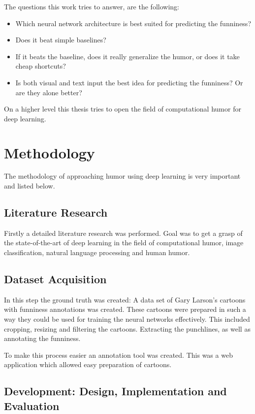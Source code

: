 \documentclass[draft,final,oneside]{vutinfth} %
\begin{document}
The questions this work tries to answer, are the following:

\begin{itemize}
\item Which neural network architecture is best suited for predicting the funniness?
\item Does it beat simple baselines?
\item If it beats the baseline, does it really generalize the humor, or does it take cheap shortcuts?
\item Is both visual and text input the best idea for predicting the funniness? Or are they alone better?
\end{itemize}

On a higher level this thesis tries to open the field of computational humor for deep learning.

\section{Methodology}

The methodology of approaching humor using deep learning is very important and listed below.

\subsection {Literature Research}

Firstly a detailed literature research was performed. Goal was to get a grasp of the state-of-the-art of deep learning in the field of computational humor, image classification, natural language processing and human humor.


\subsection {Dataset Acquisition}
In this step the ground truth was created: A data set of Gary Larson's cartoons with funniness annotations was created. These cartoons were prepared in such a way they could be used for training the neural networks effectively. This included cropping, resizing and filtering the cartoons. Extracting the punchlines, as well as annotating the funniness.

To make this process easier an annotation tool was created. This was a web application which allowed easy preparation of cartoons.

\subsection{Development: Design, Implementation and Evaluation}
\end{document}
